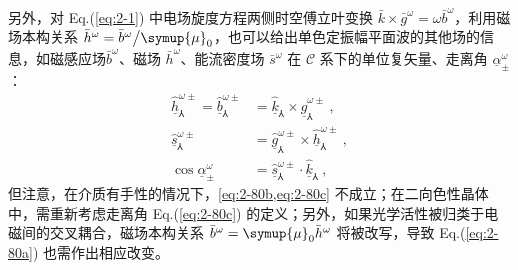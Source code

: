 另外，对 Eq.(\ref{eq:2-1}) 中电场旋度方程两侧时空傅立叶变换 $\bar{k} \times \bar{g}^{\omega} = \omega \bar{b}^{\omega} $，利用磁场本构关系 $\bar{h}^{\omega} = \bar{b}^{\omega} \big/ {\symup{\mu}}_0$，也可以给出单色定振幅平面波的其他场的信息，如磁感应场$\bar{b}^{\omega}$、磁场 $\bar{h}^{\omega}$、能流密度场 $\bar{s}^{\omega}$ 在 $\mathcal{C}$ 系下的单位复矢量、走离角 $\underline{\alpha}^{\omega}_{\pm}$：
\begin{subequations} \label{eq:2-80}
\begin{align}
	\hat{\underline{h}}^{\omega\pm}_{\Yup} = \hat{\underline{b}}^{\omega\pm}_{\Yup} &= \hat{\underline{k}}_{\Yup} \times \hat{\underline{g}}^{\omega\pm}_{\Yup} \label{eq:2-80a}~, \\ \hat{\underline{s}}^{\omega\pm}_{\Yup} &= \hat{\underline{g}}^{\omega\pm}_{\Yup} \times \hat{\underline{h}}^{\omega\pm}_{\Yup} \label{eq:2-80b}~, \\ \cos \underline{\alpha}^{\omega}_{\pm} &= \hat{\underline{s}}^{\omega\pm}_{\Yup} \cdot \hat{\underline{k}}_{\Yup} \label{eq:2-80c}~,
\end{align}
\end{subequations}
但注意，在介质有手性的情况下，\cref{eq:2-80b,eq:2-80c} 不成立\cite{nelsonDerivingTransmissionReflection1995}；在二向色性晶体中，需重新考虑走离角 Eq.(\ref{eq:2-80c}) 的定义；另外，如果光学活性被归类于电磁间的交叉耦合\cite{berryOpticalSingularitiesBianisotropic2005}，磁场本构关系 $\bar{b}^{\omega} = {\symup{\mu}}_0 \bar{h}^{\omega}$ 将被改写，导致 Eq.(\ref{eq:2-80a}) 也需作出相应改变。

